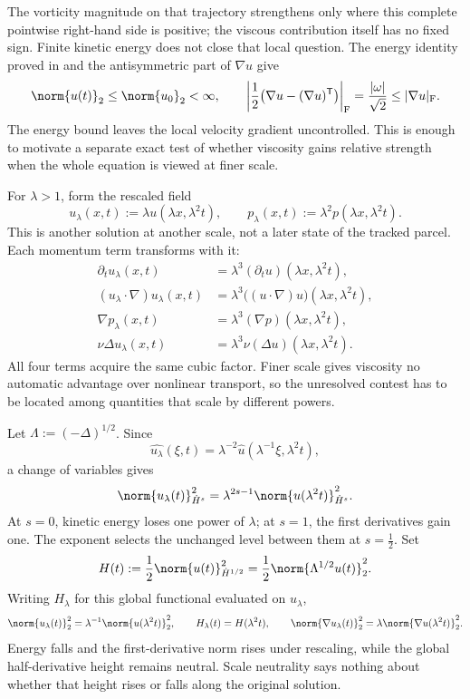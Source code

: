 The vorticity magnitude on that trajectory strengthens only where this complete pointwise right-hand side is positive; the viscous contribution itself has no fixed sign. Finite kinetic energy does not close that local question. The energy identity proved in  and the antisymmetric part of \(\nabla u\) give
\[
  \norm{u(t)}_2
  \leq
  \norm{u_0}_2
  <\infty,
  \qquad
  \left|\frac12\bigl(\nabla u-(\nabla u)^{\mathsf T}\bigr)\right|_{\mathrm F}
  =
  \frac{|\omega|}{\sqrt2}
  \leq
  |\nabla u|_{\mathrm F}.
\]
The energy bound leaves the local velocity gradient uncontrolled. This is enough to motivate a separate exact test of whether viscosity gains relative strength when the whole equation is viewed at finer scale.


For \(\lambda>1\), form the rescaled field
\[
  u_\lambda(x,t)
  :=
  \lambda u(\lambda x,\lambda^2t),
  \qquad
  p_\lambda(x,t)
  :=
  \lambda^2p(\lambda x,\lambda^2t).
\]
This is another solution at another scale, not a later state of the tracked parcel. Each momentum term transforms with it:
\[
\begin{aligned}
  \partial_tu_\lambda(x,t)
  &=
  \lambda^3(\partial_tu)(\lambda x,\lambda^2t),
  \\
  (u_\lambda\cdot\nabla)u_\lambda(x,t)
  &=
  \lambda^3\bigl((u\cdot\nabla)u\bigr)(\lambda x,\lambda^2t),
  \\
  \nabla p_\lambda(x,t)
  &=
  \lambda^3(\nabla p)(\lambda x,\lambda^2t),
  \\
  \nu\Delta u_\lambda(x,t)
  &=
  \lambda^3\nu(\Delta u)(\lambda x,\lambda^2t).
\end{aligned}
\]
All four terms acquire the same cubic factor. Finer scale gives viscosity no automatic advantage over nonlinear transport, so the unresolved contest has to be located among quantities that scale by different powers.


Let \(\Lambda:=(-\Delta)^{1/2}\). Since
\[
  \widehat{u_\lambda}(\xi,t)
  =
  \lambda^{-2}\widehat u(\lambda^{-1}\xi,\lambda^2t),
\]
a change of variables gives
\[
  \norm{u_\lambda(t)}_{\dot H^s}^2
  =
  \lambda^{2s-1}
  \norm{u(\lambda^2t)}_{\dot H^s}^2.
\]
At \(s=0\), kinetic energy loses one power of \(\lambda\); at \(s=1\), the first derivatives gain one. The exponent selects the unchanged level between them at \(s=\tfrac12\). Set
\[
  H(t)
  :=
  \frac12\norm{u(t)}_{\dot H^{1/2}}^2
  =
  \frac12\norm{\Lambda^{1/2}u(t)}_2^2.
\]
Writing \(H_\lambda\) for this global functional evaluated on \(u_\lambda\),
\[
  \norm{u_\lambda(t)}_2^2
  =
  \lambda^{-1}\norm{u(\lambda^2t)}_2^2,
  \qquad
  H_\lambda(t)=H(\lambda^2t),
  \qquad
  \norm{\nabla u_\lambda(t)}_2^2
  =
  \lambda\norm{\nabla u(\lambda^2t)}_2^2.
\]
Energy falls and the first-derivative norm rises under rescaling, while the global half-derivative height remains neutral. Scale neutrality says nothing about whether that height rises or falls along the original solution.

